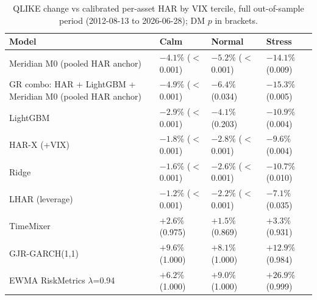 \begin{table}[!htbp]
\centering
\small
\caption{QLIKE change vs calibrated per-asset HAR by VIX tercile, full out-of-sample period (2012-08-13 to 2026-06-28); DM $p$ in brackets.}
\label{tab:volregime}
\begin{tabularx}{\linewidth}{Xlll}
\toprule
\textbf{Model} & \textbf{Calm} & \textbf{Normal} & \textbf{Stress} \\
\midrule
\rowcolor{good}Meridian M0 (pooled HAR anchor) & $-4.1\%$ ($<$0.001) & $-5.2\%$ ($<$0.001) & $-14.1\%$ (0.009) \\
\rowcolor{good}GR combo: HAR + LightGBM + Meridian M0 (pooled HAR anchor) & $-4.9\%$ ($<$0.001) & $-6.4\%$ (0.034) & $-15.3\%$ (0.005) \\
LightGBM & $-2.9\%$ ($<$0.001) & $-4.1\%$ (0.203) & $-10.9\%$ (0.004) \\
HAR-X (+VIX) & $-1.8\%$ ($<$0.001) & $-2.8\%$ ($<$0.001) & $-9.6\%$ (0.004) \\
Ridge & $-1.6\%$ ($<$0.001) & $-2.6\%$ ($<$0.001) & $-10.7\%$ (0.010) \\
LHAR (leverage) & $-1.2\%$ ($<$0.001) & $-2.2\%$ ($<$0.001) & $-7.1\%$ (0.035) \\
TimeMixer & $+2.6\%$ (0.975) & $+1.5\%$ (0.869) & $+3.3\%$ (0.931) \\
GJR-GARCH(1,1) & $+9.6\%$ (1.000) & $+8.1\%$ (1.000) & $+12.9\%$ (0.984) \\
EWMA RiskMetrics $\lambda$=0.94 & $+6.2\%$ (1.000) & $+9.0\%$ (1.000) & $+26.9\%$ (0.999) \\
\bottomrule
\end{tabularx}
\end{table}

